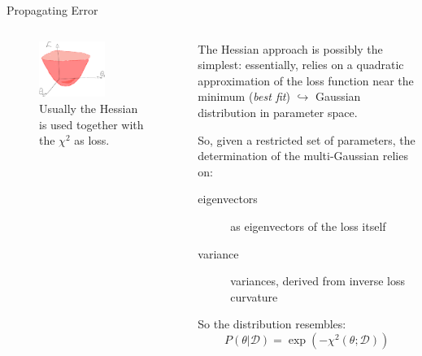\documentclass[9pt]{beamer}
\begin{document}
\begin{frame}{Propagating Error}
    \begin{columns}
        \begin{column}{0.5\textwidth}
            \begin{figure}
                \centering
                \includegraphics[width=0.6\textwidth]{hessian}
                \caption*{
                    Usually the Hessian is used together with the $\chi^2$ as
                    loss.
                }
            \end{figure}
        \end{column}
        \begin{column}{0.5\textwidth}
            The Hessian approach is possibly the simplest: essentially, relies
            on a quadratic approximation of the loss function near the minimum
            (\textit{best fit}) $\hookrightarrow$ Gaussian distribution in
            parameter space.
            \vspace*{10pt}

            So, given a restricted set of parameters, the determination of the
            multi-Gaussian relies on:
            \begin{description}
                \item[eigenvectors] as eigenvectors of the loss itself
                \item[variance] variances, derived from inverse loss curvature
            \end{description}
            \vspace*{10pt}

            So the distribution resembles:
            \begin{equation*}
                P(\theta | \mathcal{D}) = \exp(-\chi^2(\theta; \mathcal{D}))
            \end{equation*}
        \end{column}
    \end{columns}
    
\end{frame}
\end{document}
